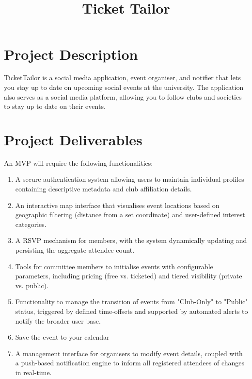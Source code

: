 \title{Ticket Tailor}

\maketitle
\section*{Project Description}
TicketTailor is a social media application, event organiser, and notifier that lets you stay up to date on upcoming social events at the university. 
The application also serves as a social media platform, allowing you to follow clubs and societies to stay up to date on their events.

\section*{Project Deliverables}
An MVP will require the following functionalities:
\begin{enumerate}
\item A secure authentication system allowing users to maintain individual profiles containing descriptive metadata and club affiliation details.
\item An interactive map interface that visualises event locations based on geographic filtering (distance from a set coordinate) and user-defined interest categories.
\item A RSVP mechanism for members, with the system dynamically updating and persisting the aggregate attendee count.
\item Tools for committee members to initialise events with configurable parameters, including pricing (free vs. ticketed) and tiered visibility (private vs. public).
\item Functionality to manage the transition of events from "Club-Only" to "Public" status, triggered by defined time-offsets and supported by automated alerts to notify the broader user base.
\item Save the event to your calendar
\item A management interface for organisers to modify event details, coupled with a push-based notification engine to inform all registered attendees of changes in real-time.
\end{enumerate}

